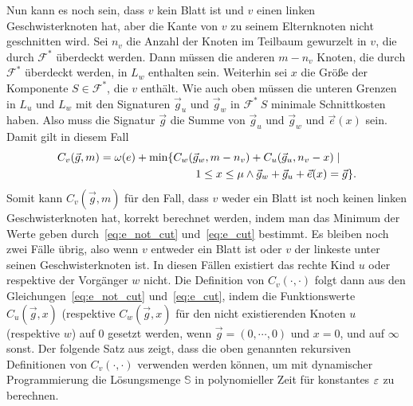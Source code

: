 Nun kann es noch sein, dass $v$ kein Blatt ist und $v$ einen linken Geschwisterknoten hat, aber die Kante von $v$ zu seinem Elternknoten nicht geschnitten wird.
Sei $n_v$ die Anzahl der Knoten im Teilbaum gewurzelt in $v$, die durch $\mathcal{F}^*$ überdeckt werden.
Dann müssen die anderen $m - n_v$ Knoten, die durch $\mathcal{F}^*$ überdeckt werden, in $L_w$ enthalten sein.
Weiterhin sei $x$ die Größe der Komponente $S \in \mathcal{F}^*$, die $v$ enthält.
Wie auch oben müssen die unteren Grenzen in $L_u$ und $L_w$ mit den Signaturen $\vec{g}_u$ und $\vec{g}_w$ in $\mathcal{F}^* \ {S}$ minimale Schnittkosten haben.
Also muss die Signatur $\vec{g}$ die Summe von $\vec{g}_u$ und $\vec{g}_w$ und $\vec{e}(x)$ sein.
Damit gilt in diesem Fall
\begin{equation} \label{eq:e_cut}
    \begin{aligned}
        C_v(\vec{g}, m) = \omega(e) + \min \{ & C_w(\vec{g}_w, m - n_v) + C_u(\vec{g}_u, n_v - x) \mid \\ & \qquad 1 \leq x \leq \mu \land \vec{g}_w + \vec{g}_u + \vec{e}(x) = \vec{g} \}.
    \end{aligned}
\end{equation}
Somit kann $C_v(\vec{g}, m)$ für den Fall, dass $v$ weder ein Blatt ist noch keinen linken Geschwisterknoten hat, korrekt berechnet werden, indem man das Minimum der Werte geben durch~\eqref{eq:e_not_cut} und~\eqref{eq:e_cut} bestimmt.
Es bleiben noch zwei Fälle übrig, also wenn $v$ entweder ein Blatt ist oder $v$ der linkeste unter seinen Geschwisterknoten ist.
In diesen Fällen existiert das rechte Kind $u$ oder respektive der Vorgänger $w$ nicht.
Die Definition von $C_v(\cdot, \cdot)$ folgt dann aus den Gleichungen~\eqref{eq:e_not_cut} und~\eqref{eq:e_cut}, indem die Funktionswerte $C_u(\vec{g}, x)$ (respektive $C_w(\vec{g}, x)$ für den nicht existierenden Knoten $u$ (respektive $w$) auf $0$ gesetzt werden, wenn $\vec{g} = (0, \cdots, 0)$ und $x = 0$, und auf $\infty$ sonst. 
Der folgende Satz aus \parencite{ff13} zeigt, dass die oben genannten rekursiven Definitionen von $C_v(\cdot, \cdot)$ verwenden werden können, um mit dynamischer Programmierung die Lösungsmenge $\mathbb{S}$ in polynomieller Zeit für konstantes $\varepsilon$ zu berechnen. \\

